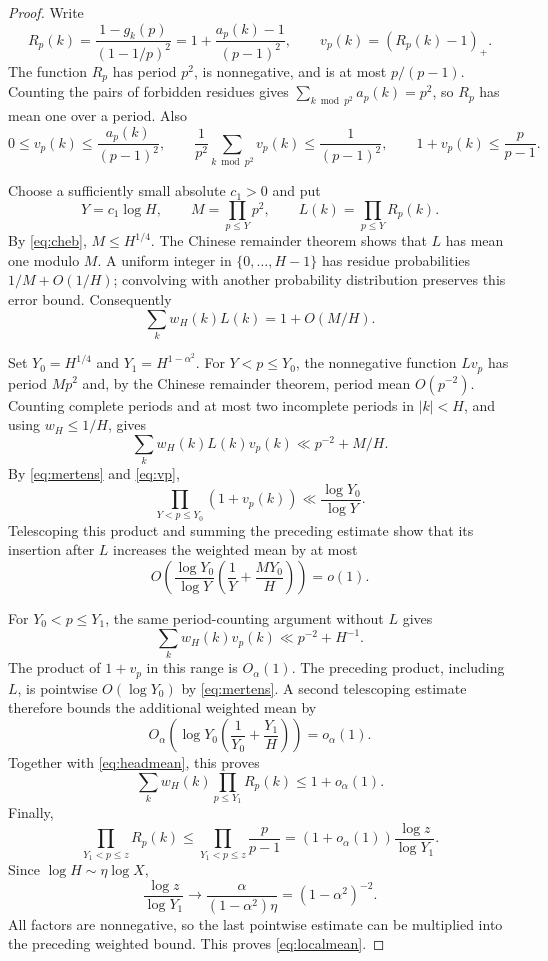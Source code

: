 \documentclass[11pt,reqno]{amsart}
\theoremstyle{remark}
\numberwithin{equation}{section}
\begin{document}
\begin{proof}
Write
\[
 R_p(k)=\frac{1-g_k(p)}{(1-1/p)^2}
 =1+\frac{a_p(k)-1}{(p-1)^2},\qquad
 v_p(k)=(R_p(k)-1)_+.
\]
The function $R_p$ has period $p^2$, is nonnegative, and is at most
$p/(p-1)$. Counting the pairs of forbidden residues gives
$\sum_{k\bmod p^2}a_p(k)=p^2$, so $R_p$ has mean one over a period.
Also
\begin{equation}\label{eq:vp}
 0\leq v_p(k)\leq\frac{a_p(k)}{(p-1)^2},\qquad
 \frac1{p^2}\sum_{k\bmod p^2}v_p(k)\leq\frac1{(p-1)^2},
 \qquad 1+v_p(k)\leq\frac p{p-1}.
\end{equation}

Choose a sufficiently small absolute $c_1>0$ and put
\[
 Y=c_1\log H,\qquad M=\prod_{p\leq Y}p^2,\qquad
 L(k)=\prod_{p\leq Y}R_p(k).
\]
By \eqref{eq:cheb}, $M\leq H^{1/4}$.
The Chinese remainder theorem shows that $L$ has mean one modulo $M$.
A uniform integer in $\{0,\ldots,H-1\}$ has residue probabilities
$1/M+O(1/H)$; convolving with another probability distribution
preserves this error bound. Consequently
\begin{equation}\label{eq:headmean}
 \sum_kw_H(k)L(k)=1+O(M/H).
\end{equation}

Set $Y_0=H^{1/4}$ and $Y_1=H^{1-\alpha^2}$.
For $Y<p\leq Y_0$, the nonnegative function $Lv_p$ has period
$Mp^2$ and, by the Chinese remainder theorem, period mean
$O(p^{-2})$. Counting complete periods and at most two incomplete
periods in $|k|<H$, and using $w_H\leq1/H$, gives
\[
 \sum_kw_H(k)L(k)v_p(k)\ll p^{-2}+M/H.
\]
By \eqref{eq:mertens} and \eqref{eq:vp},
\[
 \prod_{Y<p\leq Y_0}(1+v_p(k))\ll\frac{\log Y_0}{\log Y}.
\]
Telescoping this product and summing the preceding estimate show that
its insertion after $L$ increases the weighted mean by at most
\[
 O\left(\frac{\log Y_0}{\log Y}
       \left(\frac1Y+\frac{MY_0}{H}\right)\right)=o(1).
\]

For $Y_0<p\leq Y_1$, the same period-counting argument without $L$
gives
\[
 \sum_kw_H(k)v_p(k)\ll p^{-2}+H^{-1}.
\]
The product of $1+v_p$ in this range is $O_\alpha(1)$.
The preceding product, including $L$, is pointwise $O(\log Y_0)$
by \eqref{eq:mertens}. A second telescoping estimate therefore
bounds the additional weighted mean by
\[
 O_\alpha\left(\log Y_0
       \left(\frac1{Y_0}+\frac{Y_1}{H}\right)\right)=o_\alpha(1).
\]
Together with \eqref{eq:headmean}, this proves
\[
 \sum_kw_H(k)\prod_{p\leq Y_1}R_p(k)\leq1+o_\alpha(1).
\]
Finally,
\[
 \prod_{Y_1<p\leq z}R_p(k)
 \leq\prod_{Y_1<p\leq z}\frac p{p-1}
 =(1+o_\alpha(1))\frac{\log z}{\log Y_1}.
\]
Since $\log H\sim\eta\log X$,
\[
 \frac{\log z}{\log Y_1}\longrightarrow
 \frac{\alpha}{(1-\alpha^2)\eta}=(1-\alpha^2)^{-2}.
\]
All factors are nonnegative, so the last pointwise estimate can be
multiplied into the preceding weighted bound. This proves
\eqref{eq:localmean}.
\end{proof}
\end{document}
